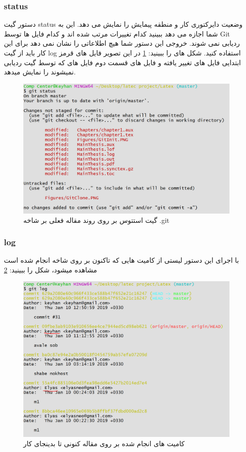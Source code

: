 \subsubsection{status}
دستور گیت status  وضعیت دایرکتوری کار و منطقه پیمایش را نمایش می دهد. این به شما اجازه می دهد ببینید کدام تغییرات مرتب شده اند و کدام فایل ها توسط Git ردیابی نمی شوند. خروجی این دستور شما هیچ اطلاعاتی را نشان نمی دهد برای این کار باید از گیت log استفاده کنید. شکل های را ببینید: \ref{Fig:GitStatus} در این تصویر فایل های قرمز ابتدایی فایل های تغییر یافته و فایل های قسمت دوم فایل های که توسط گیت ردیابی نمیشوند را نمایش میدهد.  
\begin{figure}[tbh]
	\centering
	\includegraphics[width=1\textwidth]{./Figures/GitStatus}
	\caption{ گیت استتوس بر روی روند مقاله فعلی بر شاخه .git }
	\label{Fig:GitStatus}
\end{figure}
\newpage
\subsubsection{log}
با اجرای این دستور لیستی از کامیت هایی که تاکنون بر روی شاخه انجام شده است مشاهده میشود، شکل را ببینید: \ref{Fig:GitLog}
\begin{figure}[tbh]
	\centering
	\includegraphics[width=1\textwidth]{./Figures/GitLog}
	\caption{ کامیت های انجام شده بر روی مقاله کنونی تا بدینجای کار }
	\label{Fig:GitLog}
\end{figure}
